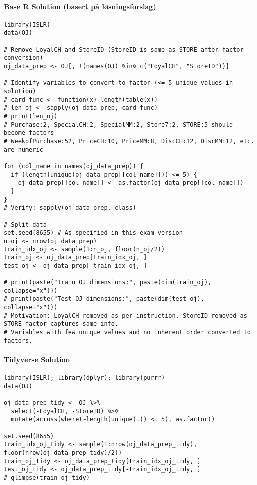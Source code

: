 \documentclass[12pt,a4paper]{article}
\begin{document}
        \paragraph{Base R Solution (basert på løsningsforslag)}
\begin{lstlisting}[]
library(ISLR)
data(OJ)

# Remove LoyalCH and StoreID (StoreID is same as STORE after factor conversion)
oj_data_prep <- OJ[, !(names(OJ) %in% c("LoyalCH", "StoreID"))]

# Identify variables to convert to factor (<= 5 unique values in solution)
# card_func <- function(x) length(table(x))
# len_oj <- sapply(oj_data_prep, card_func)
# print(len_oj) 
# Purchase:2, SpecialCH:2, SpecialMM:2, Store7:2, STORE:5 should become factors
# WeekofPurchase:52, PriceCH:10, PriceMM:8, DiscCH:12, DiscMM:12, etc. are numeric

for (col_name in names(oj_data_prep)) {
  if (length(unique(oj_data_prep[[col_name]])) <= 5) {
    oj_data_prep[[col_name]] <- as.factor(oj_data_prep[[col_name]])
  }
}
# Verify: sapply(oj_data_prep, class)

# Split data
set.seed(8655) # As specified in this exam version
n_oj <- nrow(oj_data_prep)
train_idx_oj <- sample(1:n_oj, floor(n_oj/2))
train_oj <- oj_data_prep[train_idx_oj, ]
test_oj <- oj_data_prep[-train_idx_oj, ]

# print(paste("Train OJ dimensions:", paste(dim(train_oj), collapse="x")))
# print(paste("Test OJ dimensions:", paste(dim(test_oj), collapse="x")))
# Motivation: LoyalCH removed as per instruction. StoreID removed as STORE factor captures same info.
# Variables with few unique values and no inherent order converted to factors.
\end{lstlisting}
        \paragraph{Tidyverse Solution}
\begin{lstlisting}
library(ISLR); library(dplyr); library(purrr)
data(OJ)

oj_data_prep_tidy <- OJ %>%
  select(-LoyalCH, -StoreID) %>%
  mutate(across(where(~length(unique(.)) <= 5), as.factor))

set.seed(8655)
train_idx_oj_tidy <- sample(1:nrow(oj_data_prep_tidy), floor(nrow(oj_data_prep_tidy)/2))
train_oj_tidy <- oj_data_prep_tidy[train_idx_oj_tidy, ]
test_oj_tidy <- oj_data_prep_tidy[-train_idx_oj_tidy, ]
# glimpse(train_oj_tidy)
\end{lstlisting}
\end{document}
